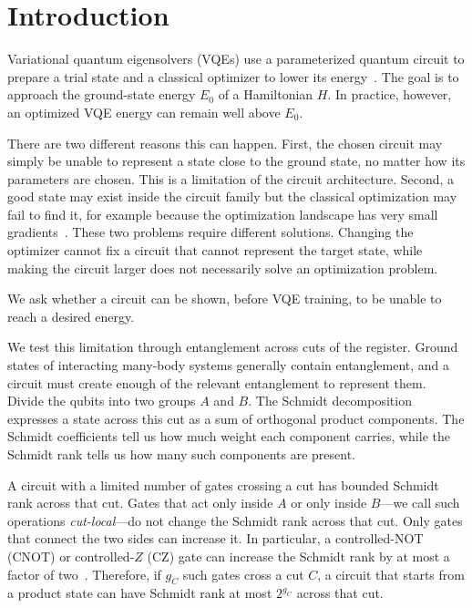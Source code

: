 \documentclass[reprint,aps,pra,floatfix,superscriptaddress,nofootinbib,longbibliography]{revtex4-2}
\theoremstyle{remark}
\theoremstyle{definition}
\begin{document}
\maketitle

\section{Introduction}
\label{sec:intro}

Variational quantum eigensolvers (VQEs) use a parameterized quantum circuit to
prepare a trial state and a classical optimizer to lower its
energy~\cite{peruzzo2014variational,mcclean2016theory,cerezo2021variational}. The
goal is to approach the ground-state energy $E_0$ of a Hamiltonian $H$. In
practice, however, an optimized VQE energy can remain well above $E_0$.

There are two different reasons this can happen. First, the chosen circuit may
simply be unable to represent a state close to the ground state, no matter how
its parameters are chosen. This is a limitation of the circuit architecture.
Second, a good state may exist inside the circuit family but the classical
optimization may fail to find it, for example because the optimization landscape
has very small gradients~\cite{mcclean2018barren,cerezo2021cost,wang2021noiseinduced}.
These two problems require different solutions. Changing the optimizer cannot
fix a circuit that cannot represent the target state, while making the circuit
larger does not necessarily solve an optimization problem.

We ask whether a circuit can be shown, before VQE training, to be unable to
reach a desired energy.

We test this limitation through entanglement across cuts of the register. Ground states of
interacting many-body systems generally contain entanglement, and a circuit must
create enough of the relevant entanglement to represent them. Divide the qubits
into two groups $A$ and $B$. The Schmidt decomposition expresses a
state across this cut as a sum of orthogonal product components. The Schmidt
coefficients tell us how much weight each component carries, while the Schmidt
rank tells us how many such components are present.

A circuit with a limited number of gates crossing a cut has bounded Schmidt
rank across that cut. Gates that
act only inside $A$ or only inside $B$---we call such operations
\emph{cut-local}---do not change the Schmidt rank across that cut. Only gates
that connect the two sides can increase it. In particular, a controlled-NOT
(CNOT) or controlled-$Z$ (CZ) gate can increase the Schmidt rank by at most a
factor of two~\cite{vatan2004optimal}. Therefore, if $g_C$ such gates cross a cut
$C$, a circuit that starts from a product state can have Schmidt rank at most
$2^{g_C}$ across that cut.
\end{document}
